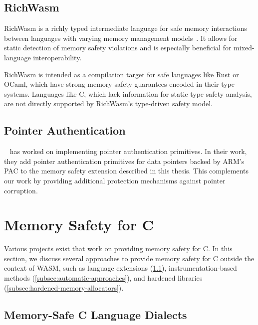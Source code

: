 \subsection{RichWasm}
\label{subsec:richwasm}

RichWasm is a richly typed intermediate language for safe memory interactions between languages with varying memory management models~\cite{paraskevopoulou2024richwasm}.
It allows for static detection of memory safety violations and is especially beneficial for mixed-language interoperability.

RichWasm is intended as a compilation target for safe languages like Rust or OCaml, which have strong memory safety guarantees encoded in their type systems.
Languages like C, which lack information for static type safety analysis, are not directly supported by RichWasm's type-driven safety model.

\subsection{Pointer Authentication}
\label{subsec:related-pointer-authentication}

\citeauthor*{rehde2023wasm}~\cite{rehde2023wasm} has worked on implementing pointer authentication primitives.
In their work, they add pointer authentication primitives for data pointers backed by ARM's \ac{PAC} to the memory safety extension described in this thesis.
This complements our work by providing additional protection mechanisms against pointer corruption.


\section{Memory Safety for C}
\label{sec:related-memory-safety}

Various projects exist that work on providing memory safety for C.
In this section, we discuss several approaches to provide memory safety for C outside the context of \ac{WASM}, such as language extensions (\cref{subsec:extensions-to-the-c-language}), instrumentation-based methods (\cref{subsec:automatic-approaches}), and hardened libraries (\cref{subsec:hardened-memory-allocators}).

\subsection{Memory-Safe C Language Dialects}
\label{subsec:extensions-to-the-c-language}

